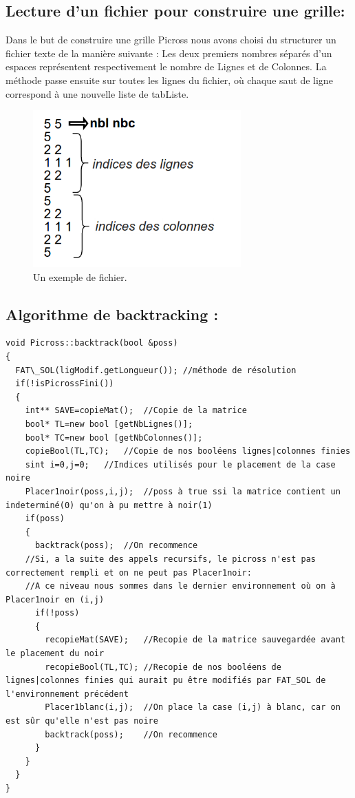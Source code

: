 \documentclass{article}
\begin{document}
\subsection{Lecture d'un fichier pour construire une grille:}
Dans le but de construire une grille Picross nous avons choisi du structurer un fichier texte de la manière suivante :\newline
Les deux premiers nombres séparés d'un espaces représentent respectivement le nombre de Lignes et de Colonnes.
La méthode passe ensuite sur toutes les lignes du fichier, où chaque saut de ligne correspond à une nouvelle liste de tabListe.
\begin{figure}[h]
\begin{center}
\includegraphics[width=8cm]{ex2}
\end{center}
\caption{Un exemple de fichier.}
\end{figure}
\newpage
\subsection{Algorithme de backtracking :}
\begin{verbatim}
void Picross::backtrack(bool &poss)
{
  FAT\_SOL(ligModif.getLongueur()); //méthode de résolution
  if(!isPicrossFini())
  {
    int** SAVE=copieMat();	//Copie de la matrice
    bool* TL=new bool [getNbLignes()];
    bool* TC=new bool [getNbColonnes()];
    copieBool(TL,TC);	//Copie de nos booléens lignes|colonnes finies
    sint i=0,j=0;	//Indices utilisés pour le placement de la case noire
    Placer1noir(poss,i,j);	//poss à true ssi la matrice contient un indeterminé(0) qu'on à pu mettre à noir(1)
    if(poss)
    {
      backtrack(poss);	//On recommence
	//Si, a la suite des appels recursifs, le picross n'est pas correctement rempli et on ne peut pas Placer1noir:
	//A ce niveau nous sommes dans le dernier environnement où on à Placer1noir en (i,j)
      if(!poss)
      {
        recopieMat(SAVE);	//Recopie de la matrice sauvegardée avant le placement du noir
        recopieBool(TL,TC);	//Recopie de nos booléens de lignes|colonnes finies qui aurait pu être modifiés par FAT_SOL de l'environnement précédent
        Placer1blanc(i,j);	//On place la case (i,j) à blanc, car on est sûr qu'elle n'est pas noire
        backtrack(poss);	//On recommence
      }
    }
  }
}
\end{verbatim}
\end{document}
